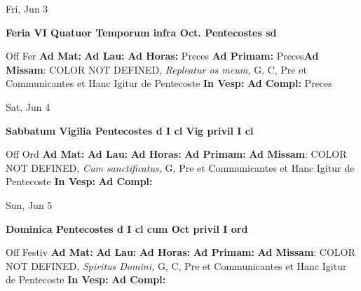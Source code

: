 \documentclass[10pt]{memoir}
\begin{document}
\begin{center}
\begin{minipage}{3.5in}
\vspace{2em}
\begin{center}Fri, Jun 3
\end{center}
\textbf{ \large Feria VI Quatuor Temporum infra Oct. Pentecostes
\textnormal{\normalsize sd}}

\begin{justify}Off Fer
\textbf{Ad Mat: }
\textbf{Ad Lau: }
\textbf{Ad Horas: }Preces
\textbf{Ad Primam: }Preces\textbf{Ad Missam}: COLOR NOT DEFINED, \textit{Repleatur os meum,} G, C, Pre et Communicantes et Hanc Igitur de Pentecoste
\textbf{In Vesp: }
\textbf{Ad Compl: }Preces
\end{justify}
\end{minipage}
\end{center}

\begin{center}
\begin{minipage}{3.5in}
\vspace{2em}
\begin{center}Sat, Jun 4
\end{center}
\textbf{ \large Sabbatum Vigilia Pentecostes
\textnormal{\normalsize d I cl Vig privil I cl}}

\begin{justify}Off Ord
\textbf{Ad Mat: }
\textbf{Ad Lau: }
\textbf{Ad Horas: }
\textbf{Ad Primam: }\textbf{Ad Missam}: COLOR NOT DEFINED, \textit{Cum sanctificatus,} G, Pre et Communicantes et Hanc Igitur de Pentecoste
\textbf{In Vesp: }
\textbf{Ad Compl: }
\end{justify}
\end{minipage}
\end{center}

\begin{center}
\begin{minipage}{3.5in}
\vspace{2em}
\begin{center}Sun, Jun 5
\end{center}
\textbf{ \large Dominica Pentecostes
\textnormal{\normalsize d I cl cum Oct privil I ord}}

\begin{justify}Off Festiv
\textbf{Ad Mat: }
\textbf{Ad Lau: }
\textbf{Ad Horas: }
\textbf{Ad Primam: }\textbf{Ad Missam}: COLOR NOT DEFINED, \textit{Spiritus Domini,} G, C, Pre et Communicantes et Hanc Igitur de Pentecoste
\textbf{In Vesp: }
\textbf{Ad Compl: }
\end{justify}
\end{minipage}
\end{center}
\end{document}
